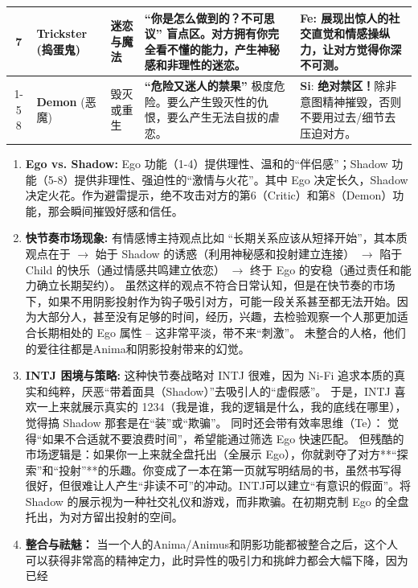 \documentclass[UTF8,letter,10pt]{ctexart}
\begin{document}
\begin{table}[h!]
{\begin{tabular}{@{}c l l p{12cm} p{7cm}@{}}
7 & \textbf{Trickster} (捣蛋鬼) & \textbf{迷恋与魔法} & \textbf{``你是怎么做到的？不可思议''} \newline 盲点区。对方拥有你完全看不懂的能力，产生神秘感和非理性的迷恋。 & \textbf{Fe}: 展现出惊人的社交直觉和情感操纵力，让对方觉得你深不可测。 \\ \cmidrule{1-5}
8 & \textbf{Demon} (恶魔) & 毁灭或重生 & \textbf{``危险又迷人的禁果''} \newline 极度危险。要么产生毁灭性的仇恨，要么产生无法自拔的虐恋。 & \textbf{Si}: \textbf{绝对禁区！}除非意图精神摧毁，否则不要用过去/细节去压迫对方。 \\ \bottomrule
\end{tabular} }

\footnotesize
\begin{enumerate}
    \item \textbf{Ego vs. Shadow:} Ego 功能（1-4）提供理性、温和的``伴侣感''；Shadow 功能（5-8）提供非理性、强迫性的``激情与火花''。其中 Ego 决定长久，Shadow 决定火花。作为避雷提示，绝不攻击对方的第6（Critic）和第8（Demon）功能，那会瞬间摧毁好感和信任。
    \item \textbf{快节奏市场现象:} 有情感博主持观点比如 ``长期关系应该从短择开始''，其本质观点在于 $\rightarrow$ 始于 Shadow 的诱惑（利用神秘感和投射建立连接） $\rightarrow$ 陷于 Child 的快乐（通过情感共鸣建立依恋） $\rightarrow$ 终于 Ego 的安稳（通过责任和能力确立长期契约）。
        虽然这样的观点不符合日常认知，但是在快节奏的市场下，如果不用阴影投射作为钩子吸引对方，可能一段关系甚至都无法开始。因为大部分人，甚至没有足够的时间，经历，兴趣，去检验观察一个人那更加适合长期相处的 Ego 属性 -- 这非常平淡，带不来``刺激''。
        未整合的人格，他们的爱往往都是Anima和阴影投射带来的幻觉。
    \item \textbf{INTJ 困境与策略:} 这种快节奏战略对 INTJ 很难，因为 Ni-Fi 追求本质的真实和纯粹，厌恶``带着面具（Shadow）''去吸引人的``虚假感''。
于是，INTJ 喜欢一上来就展示真实的 1234（我是谁，我的逻辑是什么，我的底线在哪里），觉得搞 Shadow 那套是在``装''或``欺骗''。 同时还会带有效率思维（Te）： 觉得``如果不合适就不要浪费时间''，希望能通过筛选 Ego 快速匹配。
但残酷的市场逻辑是：如果你一上来就全盘托出（全展示 Ego），你就剥夺了对方**``探索''和``投射''**的乐趣。你变成了一本在第一页就写明结局的书，虽然书写得很好，但很难让人产生``非读不可''的冲动。INTJ可以建立``有意识的假面''。将 Shadow 的展示视为一种社交礼仪和游戏，而非欺骗。在初期克制 Ego 的全盘托出，为对方留出投射的空间。
    \item \textbf{整合与祛魅：} 当一个人的Anima/Animus和阴影功能都被整合之后，这个人
        可以获得非常高的精神定力，此时异性的吸引力和挑衅力都会大幅下降，因为已经

\end{enumerate}
\end{table}
\end{document}
